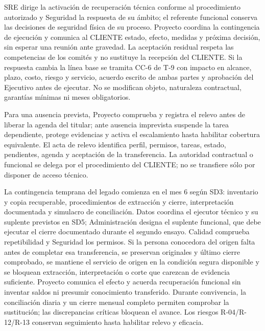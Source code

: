SRE dirige la activación de recuperación técnica conforme al procedimiento autorizado y Seguridad la respuesta de su ámbito; el referente funcional conserva las decisiones de seguridad física de su proceso. Proyecto coordina la contingencia de ejecución y comunica al CLIENTE estado, efecto, medidas y próxima decisión, sin esperar una reunión ante gravedad. La aceptación residual respeta las competencias de los comités y no sustituye la recepción del CLIENTE. Si la respuesta cambia la línea base se tramita CC-6 de T-9 con impacto en alcance, plazo, costo, riesgo y servicio, acuerdo escrito de ambas partes y aprobación del Ejecutivo antes de ejecutar. No se modifican objeto, naturaleza contractual, garantías mínimas ni meses obligatorios. \parencites[art.~72; p.~38]{sd8-ba}[RT-19.03; p.~33]{sd8-bt}

Para una ausencia prevista, Proyecto comprueba y registra el relevo antes de liberar la agenda del titular; ante ausencia imprevista suspende la tarea dependiente, protege evidencias y activa el escalamiento hasta habilitar cobertura equivalente. El acta de relevo identifica perfil, permisos, tareas, estado, pendientes, agenda y aceptación de la transferencia. La autoridad contractual o funcional se delega por el procedimiento del CLIENTE; no se transfiere sólo por disponer de acceso técnico.

La contingencia temprana del legado comienza en el mes 6 según SD3: inventario y copia recuperable, procedimientos de extracción y cierre, interpretación documentada y simulacro de conciliación. Datos coordina el ejecutor técnico y su suplente previstos en SD5; Administración designa el suplente funcional, que debe ejecutar el cierre documentado durante el segundo ensayo. Calidad comprueba repetibilidad y Seguridad los permisos. Si la persona conocedora del origen falta antes de completar esa transferencia, se preservan originales y último cierre comprobado, se mantiene el servicio de origen en la condición segura disponible y se bloquean extracción, interpretación o corte que carezcan de evidencia suficiente. Proyecto comunica el efecto y acuerda recuperación funcional sin inventar saldos ni presumir conocimiento transferido. Durante convivencia, la conciliación diaria y un cierre mensual completo permiten comprobar la sustitución; las discrepancias críticas bloquean el avance. Los riesgos R-04/R-12/R-13 conservan seguimiento hasta habilitar relevo y eficacia. \parencite[cap.~19; numeral 17.6]{sd8-c07}

